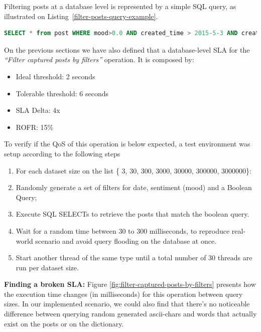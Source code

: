 Filtering posts at a database level is represented by a simple SQL query, as illustrated on Listing~\ref{filter-posts-query-example}.

\begin{lstlisting}[language=SQL,firstnumber=1, caption=Filter posts query - Example, label=filter-posts-query-example]
SELECT * from post WHERE mood>0.0 AND created_time > 2015-5-3 AND created_time < 2015-7-15 AND message like '%ruim%'
\end{lstlisting} 


On the previous sections we have also defined that a database-level SLA for the \textit{``Filter captured posts by filters''} operation. It is composed by: 

\begin{itemize}
	\item{Ideal threshold: 2 seconds}
	\item{Tolerable threshold: 6 seconds}
	\item{SLA Delta: 4x}
	\item{ROFR: 15\%}
\end{itemize}

To verify if the QoS of this operation is below expected, a test environment was setup according to the following steps

\begin{enumerate}
\item{For each dataset size on the list \{ 3, 30, 300, 3000, 30000, 300000, 3000000\}:}
\item{Randomly generate a set of filters for date, sentiment (mood) and a Boolean Query;}
\item{Execute SQL SELECTs to retrieve the posts that match the boolean query.}
\item{Wait for a random time between 30 to 300 milliseconds, to reproduce real-world scenario and avoid	query flooding on the database at once.}
\item{Start another thread of the same type until a total number of 30 threads are run per dataset size.}
\end{enumerate}


\textbf{Finding a broken SLA: }
Figure \ref{fig:filter-captured-posts-by-filters} presents how the execution time changes (in milliseconds) for this operation between query sizes. In our implemented scenario, we could also find that there's no noticeable difference between querying random generated ascii-chars and words that actually exist on the posts or on the dictionary.

